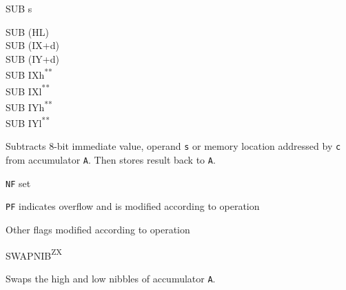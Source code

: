 \documentclass[twoside,openright,a4paper]{book}
\newcommand{\UNDOC}{\textnormal{\textsuperscript{**}}}
\newcommand{\ZXN}{\textnormal{\textsuperscript{ZX}}}
\begin{document}
\begin{basedescript}{
	\desclabelstyle{\multilinelabel}
	\desclabelwidth{3cm}}
\begin{detailitem}{SUB s}
\begin{DetailVariants}
			\columnbreak
			SUB (HL)\\
			SUB (IX+d)\\
			SUB (IY+d)\\
			SUB IXh\UNDOC\\
			SUB IXl\UNDOC\\
			SUB IYh\UNDOC\\
			SUB IYl\UNDOC\\
		\end{DetailVariants}

		Subtracts 8-bit immediate value, operand {\tt s} or memory location addressed by {\tt c} from accumulator {\tt A}. Then stores result back to {\tt A}.

		\begin{DetailEffects}
			\item {\tt NF} set
			\item {\tt PF} indicates overflow and is modified according to operation
			\item Other flags modified according to operation
		\end{DetailEffects}
						
		\begin{DetailTiming}
		\end{DetailTiming}

	\end{detailitem}

	\begin{detailitem}{SWAPNIB\ZXN}
		{
			\scriptsize
		}

		\vspace{3ex} %

		Swaps the high and low nibbles of accumulator {\tt A}.

		\DetailNoEffect
						

\end{detailitem}
\end{basedescript}
\end{document}
